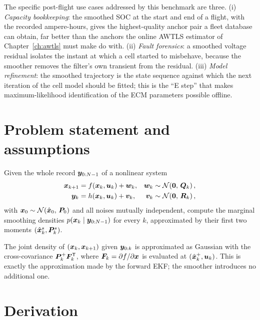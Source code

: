 The specific post-flight use cases addressed by this benchmark are three.  (i) \emph{Capacity
bookkeeping}: the smoothed SOC at the start and end of a flight, with the recorded ampere-hours,
gives the highest-quality anchor pair a fleet database can obtain, far better than the anchors the
online AWTLS estimator of Chapter~\ref{ch:awtls} must make do with.  (ii) \emph{Fault forensics}: a
smoothed voltage residual isolates the instant at which a cell started to misbehave, because the
smoother removes the filter's own transient from the residual.  (iii) \emph{Model refinement}: the
smoothed trajectory is the state sequence against which the next iteration of the cell model should
be fitted; this is the ``E step'' that makes maximum-likelihood identification of the ECM parameters
possible offline.

\section{Problem statement and assumptions}
Given the whole record $\bm{y}_{0:N-1}$ of a nonlinear system
\begin{align}
\bm{x}_{k+1}&=f(\bm{x}_k,\bm{u}_k)+\bm{w}_k, & \bm{w}_k&\sim\mathcal{N}\!\left(\bm 0,\,\bm{Q}_k\right),\label{eq:rts-f}\\
\bm{y}_k&=h(\bm{x}_k,\bm{u}_k)+\bm{v}_k, & \bm{v}_k&\sim\mathcal{N}\!\left(\bm 0,\,\bm{R}_k\right),\label{eq:rts-h}
\end{align}
with $\bm{x}_0\sim\mathcal{N}\!\left(\hat{\bm{x}}_0,\,\bm{P}_0\right)$ and all noises mutually independent, compute the marginal
smoothing densities $p(\bm{x}_k\mid \bm{y}_{0:N-1})$ for every $k$, approximated by their first two
moments $(\hat{\bm{x}}^s_k,\bm{P}^s_k)$.

\begin{assumption}\label{as:rts-lin}
The joint density of $(\bm{x}_k,\bm{x}_{k+1})$ given $\bm{y}_{0:k}$ is approximated as Gaussian with the
cross-covariance $\bm{P}^+_k\bm{F}_k^{\mathsf{T}}$, where $\bm{F}_k=\partial f/\partial\bm{x}$ is evaluated at
$(\hat{\bm{x}}^{+}_k,\bm{u}_k)$.  This is exactly the approximation made by the forward EKF; the smoother
introduces no additional one.
\end{assumption}

\section{Derivation}

